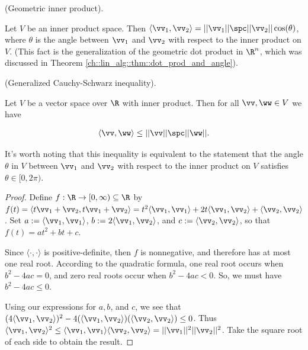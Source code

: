 \begin{remark}
    (Geometric inner product).
    
    Let $V$ be an inner product space. Then $\langle \vv_1, \vv_2 \rangle = ||\vv_1||\spc||\vv_2|| \cos(\theta)$, where $\theta$ is the angle between $\vv_1$ and $\vv_2$ with respect to the inner product on $V$. (This fact is the generalization of the geometric dot product in $\R^n$, which was discussed in Theorem \ref{ch::lin_alg::thm::dot_prod_and_angle}).
\end{remark}

\begin{theorem}
\label{ch::bilinear_forms_metric_tensors::thm::Cauchy_Schwarz}
     (Generalized Cauchy-Schwarz inequality).
     
     Let $V$ be a vector space over $\R$ with inner product. Then for all $\vv, \ww \in V$ we have
     
     \begin{align*}
     	\langle \vv, \ww \rangle \leq ||\vv|| \spc ||\ww||.
     \end{align*}
     
    It's worth noting that this inequality is equivalent to the statement that the angle $\theta$ in $V$ between $\vv_1$ and $\vv_2$ with respect to the inner product on $V$ satisfies $\theta \in [0, 2 \pi)$.
\end{theorem}

\begin{proof}
    Define $f:\R \rightarrow [0, \infty) \subseteq \R$ by $f(t) = \langle t \vv_1 + \vv_2, t \vv_1 + \vv_2 \rangle = t^2 \langle \vv_1, \vv_1 \rangle + 2t \langle \vv_1, \vv_2 \rangle + \langle \vv_2, \vv_2 \rangle$. Set $a := \langle \vv_1, \vv_1 \rangle$, $b := 2 \langle \vv_1, \vv_2 \rangle$, and $c := \langle \vv_2, \vv_2 \rangle$, so that $f(t) = at^2 + bt + c$.
    
    Since $\langle \cdot, \cdot \rangle$ is positive-definite, then $f$ is nonnegative, and therefore has at most one real root. According to the quadratic formula, one real root occurs when $b^2 - 4ac = 0$, and zero real roots occur when $b^2 - 4ac < 0$. So, we must have $b^2 - 4ac \leq 0$. 
    
    Using our expressions for $a, b$, and $c$, we see that $(4 \langle \vv_1, \vv_2 \rangle)^2 - 4(\langle \vv_1, \vv_2 \rangle)(\langle \vv_2, \vv_2 \rangle) \leq 0$. Thus \\ ${\langle \vv_1, \vv_2 \rangle^2 \leq \langle \vv_1, \vv_1 \rangle \langle \vv_2, \vv_2 \rangle = ||\vv_1||^2 ||\vv_2||^2}$. Take the square root of each side to obtain the result.  
\end{proof}

